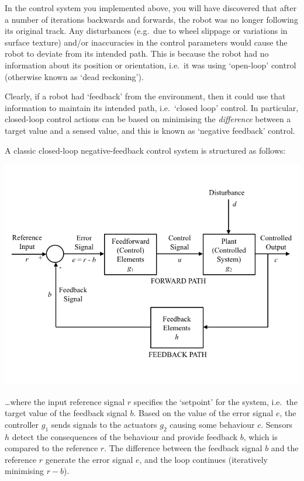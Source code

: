 \documentclass[hidelinks,a4paper,11pt]{article}
\begin{document}
In the control system you implemented above, you will have discovered that after a number of iterations backwards and forwards, the robot was no longer following its original track.  Any disturbances (e.g.\ due to wheel slippage or variations in surface texture) and/or inaccuracies in the control parameters would cause the robot to deviate from its intended path.  This is because the robot had no information about its position or orientation, i.e.\ it was using `open-loop' control (otherwise known as `dead reckoning').

Clearly, if a robot had `feedback' from the environment, then it could use that information to maintain its intended path, i.e.\ `closed loop' control.  In particular, closed-loop control actions can be based on minimising the \emph{difference} between a target value and a sensed value, and this is known as `negative feedback' control.

A classic closed-loop negative-feedback control system is structured as follows:
\begin{center}
	\includegraphics[width=\textwidth]{ClassicControlSystem.png}
\end{center}

\ldots where the input reference signal $r$ specifies the `setpoint' for the system, i.e.\ the target value of the feedback signal $b$.  Based on the value of the error signal $e$, the controller $g_1$ sends signals to the actuators $g_2$ causing some behaviour $c$.  Sensors $h$ detect the consequences of the behaviour and provide feedback $b$, which is compared to the reference $r$.  The difference between the feedback signal $b$ and the reference $r$ generate the error signal $e$, and the loop continues (iteratively minimising $r-b$).
\end{document}
